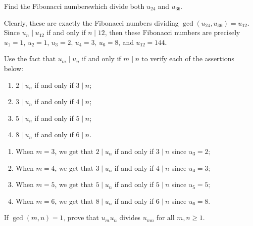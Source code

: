 \begin{exercise}
    Find the Fibonacci numberswhich divide both $u_{24}$ and $u_{36}$.\\ 
\end{exercise}

\begin{solution}
    Clearly, these are exactly the Fibonacci numbers dividing $\gcd(u_{24}, u_{36}) = u_{12}$. Since $u_n \mid u_{12}$ if and only if $n \mid 12$, then these Fibonacci numbers are precisely $u_1 = 1$, $u_2 = 1$, $u_3 = 2$, $u_4 = 3$, $u_6 = 8$, and $u_{12} = 144$.\\
\end{solution}

\begin{exercise}
    Use the fact that $u_m \mid u_n$ if and only if $m \mid n$ to verify each of the assertions below:
    \begin{enumerate}
        \item $2 \mid u_n$ if and only if $3\mid n$;
        \item $3\mid u_n$ if and only if $4\mid n$;
        \item $5\mid u_n$ if and only if $5\mid n$;
        \item $8\mid u_n$ if and only if $6\mid n$. \\
    \end{enumerate}
\end{exercise}

\begin{solution}
    \begin{enumerate}
        \item When $m = 3$, we get that $2 \mid u_n$ if and only if $3\mid n$ since $u_3 = 2$;
        \item When $m = 4$, we get that $3 \mid u_n$ if and only if $4\mid n$ since $u_4 = 3$;
        \item When $m = 5$, we get that $5 \mid u_n$ if and only if $5\mid n$ since $u_5 = 5$;
        \item When $m = 6$, we get that $8 \mid u_n$ if and only if $6\mid n$ since $u_6 = 8$. \\
    \end{enumerate}
\end{solution}

\begin{exercise}
    If $\gcd(m,n) = 1$, prove that $u_mu_n$ divides $u_{mn}$ for all $m,n \geq 1$. \\
\end{exercise}

